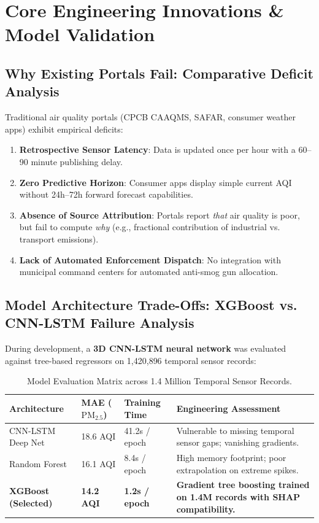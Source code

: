 \documentclass[11pt, a4paper]{article}
\begin{document}
\section{Core Engineering Innovations \& Model Validation}

\subsection{Why Existing Portals Fail: Comparative Deficit Analysis}
Traditional air quality portals (CPCB CAAQMS, SAFAR, consumer weather apps) exhibit empirical deficits:
\begin{enumerate}
    \item \textbf{Retrospective Sensor Latency}: Data is updated once per hour with a 60--90 minute publishing delay.
    \item \textbf{Zero Predictive Horizon}: Consumer apps display simple current AQI without 24h--72h forward forecast capabilities.
    \item \textbf{Absence of Source Attribution}: Portals report \textit{that} air quality is poor, but fail to compute \textit{why} (e.g., fractional contribution of industrial vs. transport emissions).
    \item \textbf{Lack of Automated Enforcement Dispatch}: No integration with municipal command centers for automated anti-smog gun allocation.
\end{enumerate}

\subsection{Model Architecture Trade-Offs: XGBoost vs. CNN-LSTM Failure Analysis}
During development, a \textbf{3D CNN-LSTM neural network} was evaluated against tree-based regressors on 1,420,896 temporal sensor records:

\begin{table}[H]
\centering
\small
{}
\begin{tabularx}{\textwidth}{L{3.4cm} L{3.4cm} L{3.4cm} Y}
\toprule
{}
\textbf{Architecture} & \textbf{MAE ($\text{PM}_{2.5}$)} & \textbf{Training Time} & \textbf{Engineering Assessment} \\
\midrule
CNN-LSTM Deep Net & 18.6 AQI & 41.2s / epoch & Vulnerable to missing temporal sensor gaps; vanishing gradients. \\
Random Forest & 16.1 AQI & 8.4s / epoch & High memory footprint; poor extrapolation on extreme spikes. \\
\textbf{XGBoost (Selected)} & \textbf{14.2 AQI} & \textbf{1.2s / epoch} & \textbf{Gradient tree boosting trained on 1.4M records with SHAP compatibility.} \\
\bottomrule
\end{tabularx}
\caption{Model Evaluation Matrix across 1.4 Million Temporal Sensor Records.}
\end{table}
\end{document}
